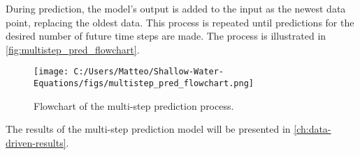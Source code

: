 During prediction, the model's output is added to the input as the newest data point, replacing the oldest data.
This process is repeated until predictions for the desired number of future time steps are made.
The process is illustrated in \autoref{fig:multistep_pred_flowchart}.
\begin{figure}[H]
    \centering
    \texttt{[image: C:/Users/Matteo/Shallow-Water-Equations/figs/multistep\_pred\_flowchart.png]}
    \caption{Flowchart of the multi-step prediction process.}\label{fig:multistep_pred_flowchart}
\end{figure}
The results of the multi-step prediction model will be presented in \autoref{ch:data-driven-results}.





